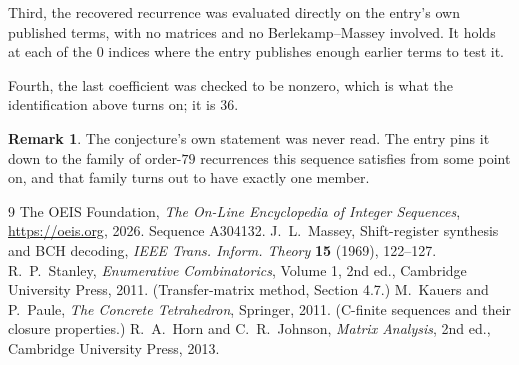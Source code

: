 \documentclass[11pt,a4paper]{article}
\theoremstyle{plain}
\theoremstyle{definition}
\newtheorem{remark}[theorem]{Remark}
\begin{document}
Third, the recovered recurrence was evaluated directly on the entry's own published terms, with
no matrices and no Berlekamp--Massey involved. It holds at each of the $0$ indices where
the entry publishes enough earlier terms to test it.

Fourth, the last coefficient was checked to be nonzero, which is what the identification above
turns on; it is $36$.

\begin{remark}
The conjecture's own statement was never read. The entry pins it down to the family of
order-$79$ recurrences this sequence satisfies from some point on, and that family turns
out to have exactly one member.
\end{remark}

\begin{thebibliography}{9}
 The OEIS Foundation, \emph{The On-Line Encyclopedia of Integer
Sequences}, \url{https://oeis.org}, 2026. Sequence A304132.
 J.~L.~Massey, Shift-register synthesis and BCH decoding, \emph{IEEE
Trans. Inform. Theory} \textbf{15} (1969), 122--127.
 R.~P.~Stanley, \emph{Enumerative Combinatorics}, Volume 1, 2nd ed.,
Cambridge University Press, 2011. (Transfer-matrix method, Section 4.7.)
 M.~Kauers and P.~Paule, \emph{The Concrete Tetrahedron}, Springer, 2011.
(C-finite sequences and their closure properties.)
 R.~A.~Horn and C.~R.~Johnson, \emph{Matrix Analysis}, 2nd ed., Cambridge
University Press, 2013.
\end{thebibliography}
\end{document}
